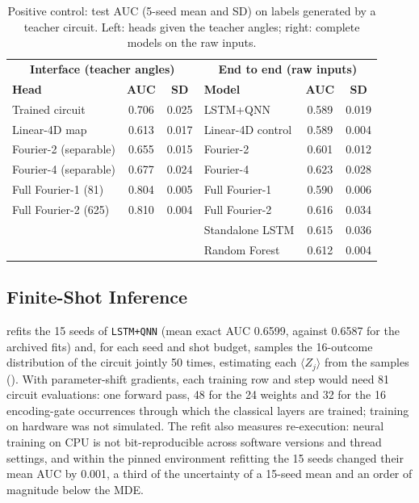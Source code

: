 \documentclass[11pt,a4paper]{article}
\begin{document}
\begin{table}[htbp]
\centering
\caption{Positive control: test AUC (5-seed mean and SD) on labels generated by a teacher circuit. Left: heads given the teacher angles; right: complete models on the raw inputs.}
\label{tab:teacher}
{\small
\begin{tabular}{lcc@{\hspace{2em}}lcc}
\toprule
\multicolumn{3}{c}{\textbf{Interface (teacher angles)}} & \multicolumn{3}{c}{\textbf{End to end (raw inputs)}} \\
\textbf{Head} & \textbf{AUC} & \textbf{SD} & \textbf{Model} & \textbf{AUC} & \textbf{SD} \\
\midrule
Trained circuit & 0.706 & 0.025 & LSTM+QNN & 0.589 & 0.019 \\
Linear-4D map & 0.613 & 0.017 & Linear-4D control & 0.589 & 0.004 \\
Fourier-2 (separable) & 0.655 & 0.015 & Fourier-2 & 0.601 & 0.012 \\
Fourier-4 (separable) & 0.677 & 0.024 & Fourier-4 & 0.623 & 0.028 \\
Full Fourier-1 (81) & 0.804 & 0.005 & Full Fourier-1 & 0.590 & 0.006 \\
Full Fourier-2 (625) & 0.810 & 0.004 & Full Fourier-2 & 0.616 & 0.034 \\
 & &  & Standalone LSTM & 0.615 & 0.036 \\
 & &  & Random Forest & 0.612 & 0.004 \\
\bottomrule
\end{tabular}}
\end{table}

\subsection{Finite-Shot Inference}
\label{app:shots}

 refits the 15 seeds of \texttt{LSTM+QNN} (mean exact AUC 0.6599, against 0.6587 for the archived fits) and, for each seed and shot budget, samples the 16-outcome distribution of the circuit jointly 50 times, estimating each $\langle Z_j\rangle$ from the samples (). With parameter-shift gradients, each training row and step would need 81 circuit evaluations: one forward pass, 48 for the 24 weights and 32 for the 16 encoding-gate occurrences through which the classical layers are trained; training on hardware was not simulated. The refit also measures re-execution: neural training on CPU is not bit-reproducible across software versions and thread settings, and within the pinned environment refitting the 15 seeds changed their mean AUC by 0.001, a third of the uncertainty of a 15-seed mean and an order of magnitude below the MDE.
\end{document}
